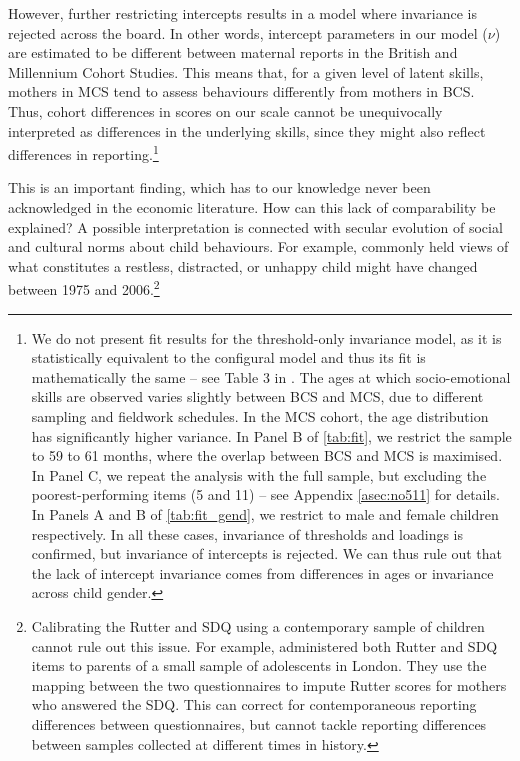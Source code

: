 However, further restricting intercepts results in a model where invariance is rejected across the board. In other words, intercept parameters in our model ($\nu$) are estimated to be different between maternal reports in the British and Millennium Cohort Studies. This means that, for a given level of latent skills, mothers in MCS tend to assess behaviours differently from mothers in BCS. Thus, cohort differences in scores on our scale cannot be unequivocally interpreted as differences in the underlying skills, since they might also reflect differences in reporting.\footnote{We do not present fit results for the threshold-only invariance model, as it is statistically equivalent to the configural model and thus its fit is mathematically the same -- see Table 3 in \citealp{Wu2016a}. The ages at which socio-emotional skills are observed varies slightly between BCS and MCS, due to different sampling and fieldwork schedules. In the MCS cohort, the age distribution has significantly higher variance. In Panel B of \autoref{tab:fit}, we restrict the sample to 59 to 61 months, where the overlap between BCS and MCS is maximised. In Panel C, we repeat the analysis with the full sample, but excluding the poorest-performing items (5 and 11) -- see Appendix \autoref{asec:no511} for details. In Panels A and B of \autoref{tab:fit_gend}, we restrict to male and female children respectively. In all these cases, invariance of thresholds and loadings is confirmed, but invariance of intercepts is rejected. We can thus rule out that the lack of intercept invariance comes from differences in ages or invariance across child gender.}

This is an important finding, which has to our knowledge never been acknowledged in the economic literature. How can this lack of comparability be explained?  A possible interpretation is connected with secular evolution of social and cultural norms about child behaviours. For example, commonly held views of what constitutes a restless, distracted, or unhappy child might have changed between 1975 and 2006.\footnote{Calibrating the Rutter and SDQ using a contemporary sample of children cannot rule out this issue. For example, \citet{Collishaw2004} administered both Rutter and SDQ items to parents of a small sample of adolescents in London. They use the mapping between the two questionnaires to impute Rutter scores for mothers who answered the SDQ. This can correct for contemporaneous reporting differences between questionnaires, but cannot tackle reporting differences between samples collected at different times in history.}

